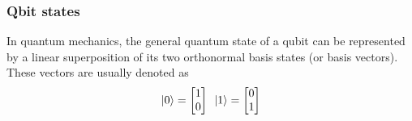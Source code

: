 \subsubsection{Qbit states}
In quantum mechanics, the general quantum state of a qubit can be represented by a linear superposition of its two orthonormal basis states (or basis vectors). These vectors are usually denoted as
\begin{equation}
\ket{0} = \begin{bmatrix}
           1\\
           0
           \end{bmatrix}
\,\,\,
\ket{1} = \begin{bmatrix}
           0\\
           1
           \end{bmatrix}
\end{equation}
	
	
	
	
	
	
	
	
	
	
	
	
	
	
	
	